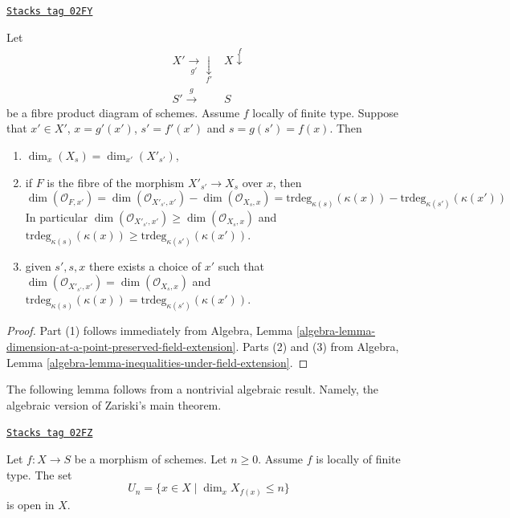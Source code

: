 \begin{lemma}
\label{morphisms-lemma-dimension-fibre-after-base-change}
\href{https://stacks.math.columbia.edu/tag/02FY}{\texttt{Stacks tag 02FY}}

Let
$$
\begin{array}{cc}X' \underset{g'}{\longrightarrow}\underset{f'}{\downarrow} & X \overset{f}{\downarrow} \\ S' \overset{g}{\longrightarrow} & S\end{array}
$$
be a fibre product diagram of schemes. Assume $f$ locally of finite type.
Suppose that $x' \in X'$, $x = g'(x')$, $s' = f'(x')$ and
$s = g(s') = f(x)$. Then
\begin{enumerate}
\item $\dim_x(X_s) = \dim_{x'}(X'_{s'})$,
\item if $F$ is the fibre of the morphism $X'_{s'} \to X_s$
over $x$, then
$$
\dim(\mathcal{O}_{F, x'}) =
\dim(\mathcal{O}_{X'_{s'}, x'}) - \dim(\mathcal{O}_{X_s, x}) =
\text{trdeg}_{\kappa(s)}(\kappa(x)) -
\text{trdeg}_{\kappa(s')}(\kappa(x'))
$$
In particular $\dim(\mathcal{O}_{X'_{s'}, x'}) \geq \dim(\mathcal{O}_{X_s, x})$
and $\text{trdeg}_{\kappa(s)}(\kappa(x)) \geq
\text{trdeg}_{\kappa(s')}(\kappa(x'))$.
\item given $s', s, x$ there exists a choice of $x'$ such that
$\dim(\mathcal{O}_{X'_{s'}, x'}) = \dim(\mathcal{O}_{X_s, x})$ and
$\text{trdeg}_{\kappa(s)}(\kappa(x)) = \text{trdeg}_{\kappa(s')}(\kappa(x'))$.
\end{enumerate}
\end{lemma}

\begin{proof}
Part (1) follows immediately from
Algebra,
Lemma \ref{algebra-lemma-dimension-at-a-point-preserved-field-extension}.
Parts (2) and (3) from
Algebra, Lemma \ref{algebra-lemma-inequalities-under-field-extension}.
\end{proof}

The following lemma follows from a nontrivial algebraic result.
Namely, the algebraic version of Zariski's main theorem.

\begin{lemma}
\label{morphisms-lemma-openness-bounded-dimension-fibres}
\href{https://stacks.math.columbia.edu/tag/02FZ}{\texttt{Stacks tag 02FZ}}

\begin{reference}
\cite[IV Theorem 13.1.3]{EGA}
\end{reference}
Let $f : X \to S$ be a morphism of schemes.
Let $n \geq 0$. Assume $f$ is locally of finite type.
The set
$$
U_n = \{x \in X \mid \dim_x X_{f(x)} \leq n\}
$$
is open in $X$.
\end{lemma}

